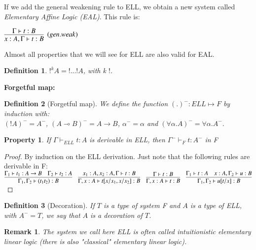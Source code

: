 \documentclass[a4paper,10pt]{article}
\newcommand{\impl}{\rightarrow}	%
\newcommand{\limpl}{\multimap}  %
\newtheorem{definition}{Definition}
\newtheorem{prop}{Property}
\newtheorem{rmk}{Remark}
\begin{document}
\par If we add the general weakening rule to ELL, we obtain a new system called \emph{Elementary Affine Logic (EAL)}. This rule is:
\begin{center}
$\infer[(gen.weak)]{x:A, \Gamma \vdash t:B}{\Gamma \vdash t:B }$
\end{center}

Almost all properties that we will see for ELL are also valid for EAL.

\begin{definition}
$!^k A = !...! A$, with k $!$.
\end{definition}


\vspace{0.3cm}
\textbf{Forgetful map:}

\begin{definition}[Forgetful map]
\par We define the function $(.)^{-} : ELL \mapsto F$ by induction with:\\
$(!A)^{-} = A^{-}$, $(A \limpl B)^{-} = A \impl B$, $\alpha^{-} = \alpha$ and $(\forall \alpha.A)^{-} = \forall \alpha.A^{-}$.
\end{definition}

\begin{prop}
\par If $\Gamma \vdash_{ELL} t:A$ is derivable in ELL, then $\Gamma^{-} \vdash_{F} t:A^{-}$ in F
\end{prop}
\begin{proof}
By induction on the ELL derivation. Just note that the following rules are derivable in F:\\
$	\infer{\Gamma_1 , \Gamma_2 \vdash (t_1 t_2):B}{\Gamma_1 \vdash t_1 :A \impl B & \Gamma_2 \vdash t_2 : A } \quad
	\infer{\Gamma, x:A \vdash t[x/x_1 , x/x_2] : B}{x_1 :A, x_2 :A, \Gamma \vdash t:B} \quad
	\infer{\Gamma , x:A \vdash t : B}{\Gamma \vdash t : B} \quad
	\infer{\Gamma_1, \Gamma_2 \vdash u[t/x] : B}{\Gamma_1 \vdash t:A  &  x:A,\Gamma_2 \vdash u:B} $
\end{proof}

\begin{definition}[Decoration]
If $T$ is a type of system F and $A$ is a type of ELL, with $A^{-}=T$, we say that $A$ is a \emph{decoration} of $T$.
\end{definition}

\begin{rmk}
The system we call here ELL is often called intuitionistic elementary linear logic (there is also "classical" elementary linear logic).
\end{rmk}
\end{document}
